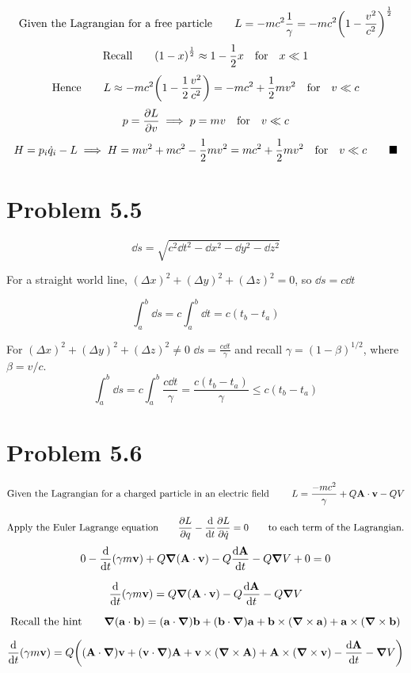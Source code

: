 \documentclass{article}
\begin{document}
\[ \text{Given the Lagrangian for a free particle}\qquad L=-mc^{2}\frac{1}{\gamma}=-mc^{2}\qty(1-\frac{v^2}{c^2})^{\frac{1}{2}} \]
\[ \text{Recall} \qquad \qty(1-x)^{\frac{1}{2}}\approx 1-\frac{1}{2}x \qq{for} x\ll 1 \]
\[ \text{Hence} \qquad L\approx -mc^{2} \qty(1-\frac{1}{2}\frac{v^2}{c^2})= -mc^2 + \frac{1}{2}mv^2 \qq{for} v\ll c\]
\[ p=\pdv{L}{v}\implies p=mv  \qq{for} v\ll c \]
\[ H= p_{i}\dot{q}_{i}-L\implies H=mv^2 +mc^2 -\frac{1}{2}mv^2=mc^2+\frac{1}{2}mv^2 \qq{for} v\ll c \qquad\blacksquare \]


 
\section*{Problem 5.5}

\[\dd s = \sqrt{c^2 \dd t^2-\dd x^2-\dd y^2-\dd z^2}\]

For a straight world line, $(\Delta x)^2+(\Delta y)^2+(\Delta z)^2=0$, so $\dd s = c\dd t$

\[\int_a^b\dd s = c\int_a^b\dd t=c(t_b-t_a)
\]

For  $(\Delta x)^2+(\Delta y)^2+(\Delta z)^2\ne 0$ $\dd s = \frac{c\dd t}{\gamma}$ and recall $\gamma=(1-\beta)^{1/2}$, where $\beta=v/c$.
\[\int_a^b\dd s = c\int_a^b\frac{c\dd t}{\gamma}=\frac{c(t_b-t_a)}{\gamma}\le c(t_b-t_a)
\]
 
\section*{Problem 5.6}

\[
\text{Given the Lagrangian for a charged particle in an electric field }\qquad L=\frac{-mc^2}{\gamma}  +Q\vb{A}\cdot \vb{v} -QV
\]

\[ \text{Apply the Euler Lagrange equation}\qquad \pdv{L}{q}-\dv{t} \pdv{L}{\dot{q}}=0 \qquad\text{to each term of the Lagrangian.}\]
\[0-\dv{t}(\gamma m \vb{v})+Q\grad{(\vb{A}\cdot\vb{v})} -Q\dv{\vb{A}}{t}-Q\grad{V}+0=0
\]

\[\dv{t}(\gamma m \vb{v})=Q\grad{(\vb{A}\cdot\vb{v})} -Q\dv{\vb{A}}{t}-Q\grad{V}
\]

\[\text{Recall the hint}\qquad\grad{(\vb{a}\cdot\vb{b})}=(\vb{a}\cdot\grad)\vb{b}+(\vb{b}\cdot\grad)\vb{a}+\vb{b}\times(\grad\times\vb{a})+\vb{a}\times(\grad\times\vb{b})
\]

\[\dv{t}(\gamma m \vb{v})=Q\qty((\vb{A}\cdot\grad)\vb{v}+(\vb{v}\cdot\grad)\vb{A}+\vb{v}\times(\grad\times\vb{A})+\vb{A}\times(\grad\times\vb{v}) -\dv{\vb{A}}{t}-\grad{V})
\]
\end{document}
